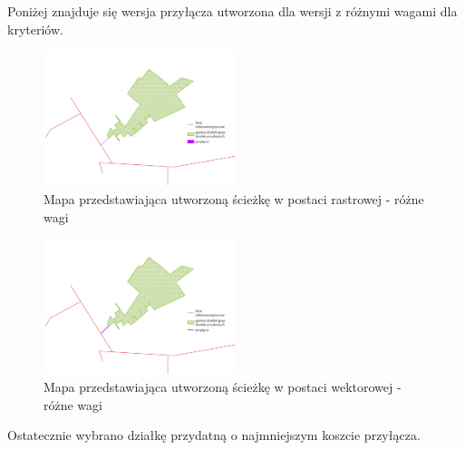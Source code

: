 \documentclass{article}
\begin{document}
Poniżej znajduje się wersja przyłącza utworzona dla wersji z różnymi wagami dla kryteriów.
\vspace{5pt}

\begin{figure}[H]
    \centering
    \includegraphics[width=0.5\textwidth]{img/roznewagi-path-raster.jpg}
    \caption{Mapa przedstawiająca utworzoną ścieżkę w postaci rastrowej - różne wagi}
\end{figure}

\begin{figure}[H]
    \centering
    \includegraphics[width=0.5\textwidth]{img/roznewagi-path-vector.jpg}
    \caption{Mapa przedstawiająca utworzoną ścieżkę w postaci wektorowej - różne wagi}
\end{figure}
\vspace{10pt}

Ostatecznie wybrano działkę przydatną o najmniejszym koszcie przyłącza.
\vspace{5pt}
\end{document}
